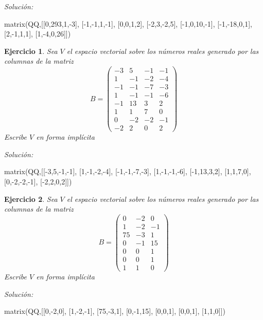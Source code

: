 \documentclass{amsart}
\newtheorem{ejer}{Ejercicio}
\begin{document}
{\it Soluci\'on:}

\begin{sageblock}
matrix(QQ,[[0,293,1,-3],
[-1,-1,1,-1],
[0,0,1,2],
[-2,3,-2,5],
[-1,0,10,-1],
[-1,-18,0,1],
[2,-1,1,1],
[1,-4,0,26]])
\end{sageblock}



\begin{ejer} Sea $V$ el espacio vectorial sobre los números reales 
generado por las columnas de la matriz 
\[B = \left(\begin{array}{rrrr}
-3 & 5 & -1 & -1 \\
1 & -1 & -2 & -4 \\
-1 & -1 & -7 & -3 \\
1 & -1 & -1 & -6 \\
-1 & 13 & 3 & 2 \\
1 & 1 & 7 & 0 \\
0 & -2 & -2 & -1 \\
-2 & 2 & 0 & 2
\end{array}\right)\]
Escribe $V$ en forma impl\'icita 
\end{ejer}

{\it Soluci\'on:}

\begin{sageblock}
matrix(QQ,[[-3,5,-1,-1],
[1,-1,-2,-4],
[-1,-1,-7,-3],
[1,-1,-1,-6],
[-1,13,3,2],
[1,1,7,0],
[0,-2,-2,-1],
[-2,2,0,2]])
\end{sageblock}



\begin{ejer} Sea $V$ el espacio vectorial sobre los números reales 
generado por las columnas de la matriz 
\[B = \left(\begin{array}{rrr}
0 & -2 & 0 \\
1 & -2 & -1 \\
75 & -3 & 1 \\
0 & -1 & 15 \\
0 & 0 & 1 \\
0 & 0 & 1 \\
1 & 1 & 0
\end{array}\right)\]
Escribe $V$ en forma impl\'icita 
\end{ejer}

{\it Soluci\'on:}

\begin{sageblock}
matrix(QQ,[[0,-2,0],
[1,-2,-1],
[75,-3,1],
[0,-1,15],
[0,0,1],
[0,0,1],
[1,1,0]])
\end{sageblock}
\end{document}
